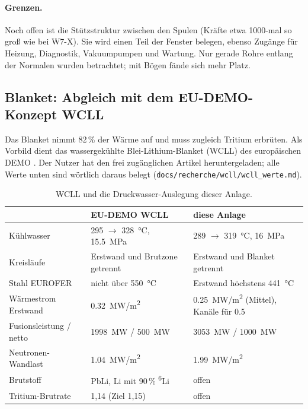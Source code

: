 \documentclass[10pt,a4paper]{article}
\begin{document}
\paragraph{Grenzen.} Noch offen ist die Stützstruktur zwischen den Spulen (Kräfte etwa 1000-mal so groß wie bei
W7-X). Sie wird einen Teil der Fenster belegen, ebenso Zugänge für Heizung, Diagnostik, Vakuumpumpen und
Wartung. Nur gerade Rohre entlang der Normalen wurden betrachtet; mit Bögen fände sich mehr Platz.

\subsection{Blanket: Abgleich mit dem EU-DEMO-Konzept WCLL}
Das Blanket nimmt 82\,\% der Wärme auf und muss zugleich Tritium erbrüten. Als Vorbild dient das wassergekühlte
Blei-Lithium-Blanket (WCLL) des europäischen DEMO \cite{arena2023}. Der Nutzer hat den frei zugänglichen Artikel
heruntergeladen; alle Werte unten sind wörtlich daraus belegt (\texttt{docs/recherche/wcll/wcll\_werte.md}).
\begin{table}[H]\centering\small
\begin{tabular}{lll}\toprule
 & EU-DEMO WCLL \cite{arena2023} & diese Anlage\\\midrule
Kühlwasser & \SI{295}{} $\rightarrow$ \SI{328}{\celsius}, \SI{15,5}{MPa} & \SI{289}{} $\rightarrow$ \SI{319}{\celsius}, \SI{16}{MPa}\\
Kreisläufe & Erstwand und Brutzone getrennt & Erstwand und Blanket getrennt\\
Stahl EUROFER & nicht über \SI{550}{\celsius} & Erstwand höchstens \SI{441}{\celsius}\\
Wärmestrom Erstwand & \SI{0,32}{MW/m^2} & \SI{0,25}{MW/m^2} (Mittel), Kanäle für \SI{0,5}{}\\
Fusionsleistung / netto & \SI{1998}{MW} / \SI{500}{MW} & \SI{3053}{MW} / \SI{1000}{MW}\\
Neutronen-Wandlast & \SI{1,04}{MW/m^2} & \SI{1,99}{MW/m^2}\\
Brutstoff & PbLi, Li mit 90\,\% \textsuperscript{6}Li & offen\\
Tritium-Brutrate & 1,14 (Ziel 1,15) & offen\\\bottomrule
\end{tabular}\caption{WCLL und die Druckwasser-Auslegung dieser Anlage.}\end{table}
\end{document}
